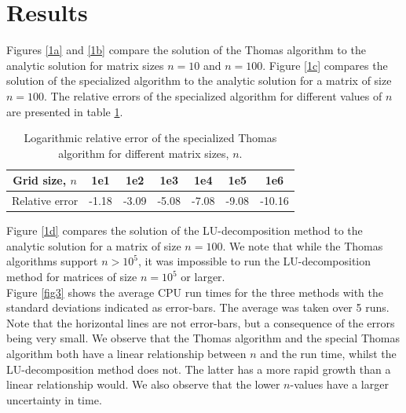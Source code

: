 \documentclass[notitlepage, reprint, nofootinbib]{revtex4-1}
\begin{document}
\section{Results}
Figures \ref{1a} and \ref{1b} compare the solution of the Thomas algorithm to the analytic solution for matrix sizes $n=10$ and $n=100$. Figure \ref{1c} compares the solution of the specialized algorithm to the analytic solution for a matrix of size $n=100$. The relative errors of the specialized algorithm for different values of $n$ are presented in table \ref{error_table}. \\[2mm]
\newpage
\begin{table}[h!]
\centering
\begin{tabular}{|c|c|c|c|c|c|c|}
\hline
Grid size, $n$ & 1e1 & 1e2 & 1e3 & 1e4 & 1e5 & 1e6 \\ \hline
Relative error & -1.18 & -3.09 & -5.08 & -7.08 & -9.08 & -10.16 \\ \hline
\end{tabular}
\caption{Logarithmic relative error of the specialized Thomas algorithm for different matrix sizes, $n$.}
\label{error_table}
\end{table}
Figure \ref{1d} compares the solution of the LU-decomposition method to the analytic solution for a matrix of size $n=100$. We note that while the Thomas algorithms support $n>10^5$, it was impossible to run the LU-decomposition method for matrices of size $n=10^5$ or larger.\\[2mm]
Figure \ref{fig3} shows the average CPU run times for the three methods with the standard deviations indicated as error-bars. The average was taken over 5 runs. Note that the horizontal lines are not error-bars, but a consequence of the errors being very small. We observe that the Thomas algorithm and the special Thomas algorithm both have a linear relationship between $n$ and the run time, whilst the LU-decomposition method does not. The latter has a more rapid growth than a linear relationship would. We also observe that the lower $n$-values have a larger uncertainty in time.

\end{document}
